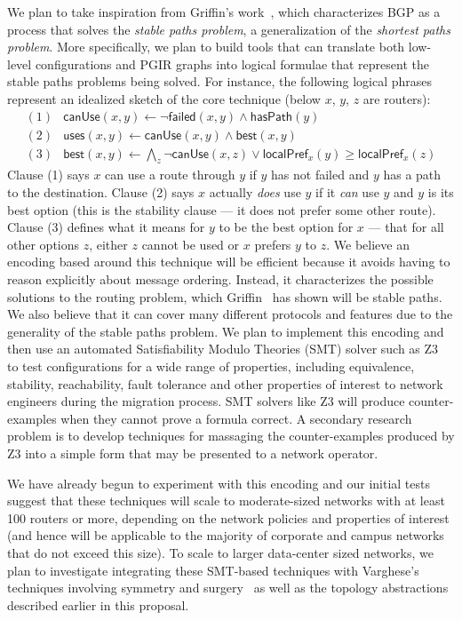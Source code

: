 We plan to take inspiration from Griffin's work~\cite{griffin+:stable-paths},
which characterizes BGP as a process that solves the \emph{stable paths problem}, a generalization of the 
\emph{shortest paths problem}.  
More specifically, we plan to build tools that can translate both low-level configurations and PGIR graphs into
logical formulae that represent the stable paths problems being solved.
For instance, the following logical phrases represent an idealized sketch of the core technique (below $x$, $y$, $z$ are routers):
%
\newcommand{\pfont}[1]{\mathsf{#1}}%
%
\[
\begin{array}{ll}
(1) & \pfont{canUse}(x,y) \leftarrow \neg \pfont{failed}(x,y) \wedge \pfont{hasPath}(y) \\
(2) & \pfont{uses}(x,y) \leftarrow \pfont{canUse}(x,y) \wedge \pfont{best}(x,y) \\
(3) & \pfont{best}(x,y) \leftarrow \bigwedge_z \neg \pfont{canUse}(x,z) \vee \pfont{localPref}_x(y) \ge \pfont{localPref}_x(z) 
\end{array}
\]
Clause (1) says $x$ can use a route through $y$ if $y$ has not failed and $y$ has a path to the destination. 
Clause (2) says $x$ actually \emph{does}
use $y$ if it \emph{can} use $y$ and $y$ is its best option (this is the stability clause --- it does not prefer some other
route).  Clause (3) defines what it means for $y$ to be the best option for $x$ --- that for all other options $z$, either
$z$ cannot be used or $x$ prefers $y$ to $z$.  We believe an encoding 
based around this technique will be efficient because it avoids having to reason
explicitly about message ordering.  Instead, it characterizes the possible solutions to the routing problem, which Griffin~\cite{griffin+:stable-paths} has shown will be stable paths.
We also believe that it can cover many different protocols and features due to the 
generality of the stable paths problem.  We plan to implement this encoding and then use an automated Satisfiability Modulo 
Theories (SMT) solver
such as Z3~\cite{z3} to test configurations for a wide range of properties, including equivalence, 
stability, reachability, fault tolerance and other properties of interest to network engineers during the
migration process.  SMT solvers like Z3 will produce counter-examples when they cannot prove a formula correct. A secondary
research problem is to develop techniques for massaging the counter-examples produced by Z3 into a simple form that may be presented
to a network operator.  

We have already begun to experiment with this encoding and our initial tests suggest
that these techniques will scale to moderate-sized networks with at least 100 routers or
more, depending on the network policies and properties of interest
(and hence will be applicable to the majority of corporate and campus networks
that do not exceed this size).  To scale to larger data-center sized networks,
we plan to investigate integrating these SMT-based techniques with
Varghese's techniques involving symmetry and surgery~\cite{bjorner+:scaling-network-verification} as well as the topology
abstractions described earlier in this proposal.



